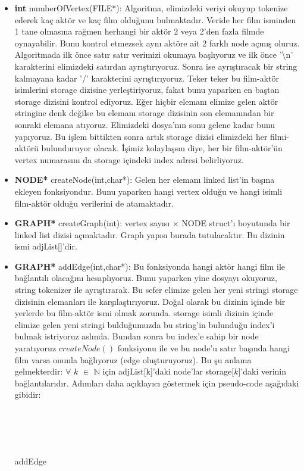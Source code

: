 \documentclass[11pt]{article}
\begin{document}
\begin{itemize}

	\item \textbf{int} \textsf{numberOfVertex(FILE*):} Algoritma, elimizdeki veriyi okuyup tokenize ederek kaç aktör ve kaç film olduğunu bulmaktadır. Veride her film isminden 1 tane olmasına rağmen herhangi bir aktör 2 veya 2'den fazla filmde oynayabilir. Bunu kontrol etmezsek aynı aktöre ait 2 farklı node açmış oluruz. Algoritmada ilk önce satır satır verimizi okumaya başlıyoruz ve ilk önce '\textbackslash n' karakterini elimizdeki satırdan ayrıştırıyoruz. Sonra ise ayrıştıracak bir string kalmayana kadar '/' karakterini ayrıştırıyoruz. Teker teker bu film-aktör isimlerini \textsf{storage} dizisine yerleştiriyoruz, fakat bunu yaparken en baştan \textsf{storage} dizisini kontrol ediyoruz. Eğer hiçbir elemanı elimize gelen aktör stringine denk değilse bu elemanı \textsf{storage} dizisinin son elemanından bir sonraki elemana atıyoruz. Elimizdeki dosya'nın sonu gelene kadar bunu yapıyoruz. Bu işlem bittikten sonra artık \textsf{storage} dizisi elimizdeki her filmi-aktörü bulunduruyor olacak. İşimiz kolaylaşsın diye, her bir film-aktör'ün vertex numarasını da \textsf{storage} içindeki index adresi belirliyoruz.
	
	\item  \textbf{NODE*} \textsf{createNode(int,char*):} Gelen her elemanı linked list'in başına ekleyen fonksiyondur. Bunu yaparken hangi vertex olduğu ve hangi isimli film-aktör olduğu verilerini de atamaktadır.
	\item \textbf{GRAPH*} \textsf{createGraph(int):} vertex sayısı $\times$ NODE struct'ı boyutunda bir linked list dizisi açmaktadır. Graph yapısı burada tutulacaktır. Bu dizinin ismi adjList[]'dir.
	
	\item \textbf{GRAPH*} \textsf{addEdge(int,char*):} Bu fonksiyonda hangi aktör hangi film ile bağlantılı olacağını hesaplıyoruz. Bunu yaparken yine dosyayı okuyoruz, string tokenizer ile ayrıştırarak. Bu sefer elimize gelen her yeni stringi \textsf{storage} dizisinin elemanları ile karşılaştırıyoruz.  Doğal olarak bu dizinin içinde bir yerlerde bu film-aktör ismi olmak zorunda. \textsf{storage} isimli dizinin içinde elimize gelen yeni stringi bulduğumuzda bu string'in bulunduğu index'i bulmak istriyoruz aslında. Bundan sonra bu index'e sahip bir node yaratıyoruz $createNode()$ fonksiyonu ile ve bu node'u satır başında hangi film varsa onunla bağlıyoruz (edge oluşturuyoruz). Bu şu anlama gelmekterdir: $\forall$ $k$ $\in$ $\mathbb{N}$ için adjList[k]'daki node'lar \textsf{storage[$k$]}'daki verinin bağlantılarıdır. Adımları daha açıklayıcı göstermek için pseudo-code aşağıdaki gibidir: \\
\\
\\
\\
\\
\begin{algorithm}
\caption{addEdge}
\begin{algorithmic}[1]


\end{algorithmic}
\end{algorithm}
\end{itemize}
\end{document}
